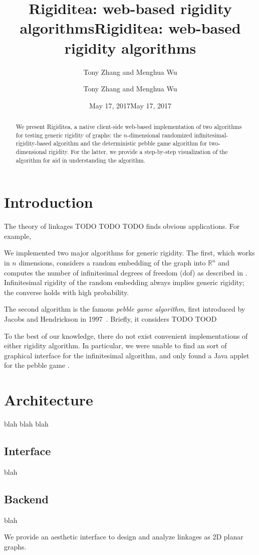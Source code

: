 \documentclass[aps,final,twocolumn,letterpaper,nofootinbib]{revtex4-1}
\title{Rigiditea: web-based rigidity algorithms}
\author{Tony Zhang and Menghua Wu}
\date{May 17, 2017}
\newcommand\RR{\mathbb{R}}
\newcommand\headers{
    \title{Rigiditea: web-based rigidity algorithms}
    \author{Tony Zhang and Menghua Wu}
    \date{May 17, 2017}    
    \begin{abstract}
        We present Rigiditea,
        a native client-side web-based implementation of two algorithms
        for testing generic rigidity of graphs:
        the $n$-dimensional randomized infinitesimal-rigidity-based algorithm
        and the deterministic pebble game algorithm for two-dimensional rigidity.
        For the latter, we provide a step-by-step visualization of the algorithm
        for aid in understanding the algorithm.
    \end{abstract}
}
\begin{document}
\ifrevtex\headers\fi

\maketitle




\tableofcontents

\section{Introduction}

The theory of linkages TODO TODO TODO
finds obvious applications.
For example, 

We implemented two major algorithms for generic rigidity.
The first, which works in $n$ dimensions,
considers a random embedding of the graph into $\RR^n$
and computes the number of infinitesimal degrees of freedom (dof)
as described in \cite[\S4.4.2]{gfalop}.
Infinitesimal rigidity of the random embedding always implies generic rigidity;
the converse holds with high probability.

The second algorithm is the famous \emph{pebble game algorithm},
first introduced by Jacobs and Hendrickson in 1997~\cite{jacobs97}.
Briefly, it considers TODO TOOD

To the best of our knowledge,
there do not exist convenient implementations of
either rigidity algorithm.
In particular,
we were unable to find an sort of graphical interface
for the infinitesimal algorithm,
and only found a Java applet for the pebble game \cite{stjohnapplet}.


\section{Architecture}

blah blah blah

\subsection{Interface}

blah
 
\subsection{Backend}
blah

We provide an aesthetic interface
to design and analyze linkages as 2D planar graphs.
\end{document}
